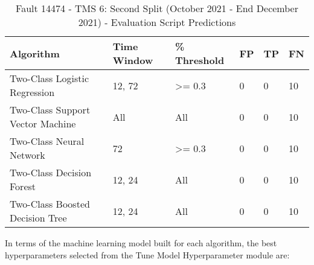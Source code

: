 \begin{table}[!ht]
    \centering
    \begin{tabular}{|l|l|l|l|l|l|}
    \hline
        Algorithm & Time Window & \% Threshold & FP & TP & FN \\ \hline
        Two-Class Logistic Regression & 12, 72 & >= 0.3 & 0 & 0 & 10 \\ \hline
        Two-Class Support Vector Machine & All & All & 0 & 0 & 10 \\ \hline
        Two-Class Neural Network & 72 & >= 0.3 & 0 & 0 & 10 \\ \hline
        Two-Class Decision Forest & 12, 24 & All & 0 & 0 & 10 \\ \hline
        Two-Class Boosted Decision Tree & 12, 24 & All & 0 & 0 & 10 \\ \hline
    \end{tabular}
    \caption{Fault 14474 - TMS 6: Second Split (October 2021 - End December 2021) - Evaluation Script Predictions}
    \label{9112_SCA34_1st}
\end{table}

In terms of the machine learning model built for each algorithm, the best hyperparameters selected from the Tune Model Hyperparameter module are:

